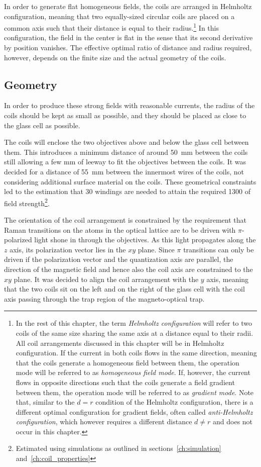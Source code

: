 In order to generate flat homogeneous fields, the coils are arranged in Helmholtz configuration, meaning that two equally-sized circular coils are placed on a common axis such that their distance is equal to their radius.\footnote{In the rest of this chapter, the term \textit{Helmholtz configuration} will refer to two coils of the same size sharing the same axis at a distance equal to their radii. All coil arrangements discussed in this chapter will be in Helmholtz configuration. If the current in both coils flows in the same direction, meaning that the coils generate a homogeneous field between them, the operation mode will be referred to as \textit{homogeneous field mode}. If, however, the current flows in opposite directions such that the coils generate a field gradient between them, the operation mode will be referred to as \textit{gradient mode}. Note that, similar to the $d = r$ condition of the Helmholtz configuration, there is a different optimal configuration for gradient fields, often called \textit{anti-Helmholtz configuration}, which however requires a different distance $d \neq r$ and does not occur in this chapter.} In this configuration, the field in the center is flat in the sense that its second derivative by position vanishes. The effective optimal ratio of distance and radius required, however, depends on the finite size and the actual geometry of the coils.

\subsection*{Geometry}
In order to produce these strong fields with reasonable currents, the radius of the coils should be kept as small as possible, and they should be placed as close to the glass cell as possible.

The coils will enclose the two objectives above and below the glass cell between them. This introduces a minimum distance of around \SI{50}{\milli\meter} between the coils still allowing a few \si[]{\milli\meter} of leeway to fit the objectives between the coils. It was decided for a distance of \SI{55}{\milli\meter} between the innermost wires of the coils, not considering additional surface material on the coils. These geometrical constraints led to the estimation that 30 windings are needed to attain the required \SI{1300}{\gauss} of field strength\footnote{Estimated using simulations as outlined in sections~\ref{ch:simulation} and~\ref{ch:coil_properties}}.

The orientation of the coil arrangement is constrained by the requirement that Raman transitions on the atoms in the optical lattice are to be driven with $\pi$-polarized light shone in through the objectives. As this light propagates along the $z$ axis, its polarization vector lies in the $xy$ plane. Since $\pi$ transitions can only be driven if the polarization vector and the quantization axis are parallel, the direction of the magnetic field and hence also the coil axis are constrained to the $xy$ plane. It was decided to align the coil arrangement with the $y$ axis, meaning that the two coils sit on the left and on the right of the glass cell with the coil axis passing through the trap region of the magneto-optical trap.

